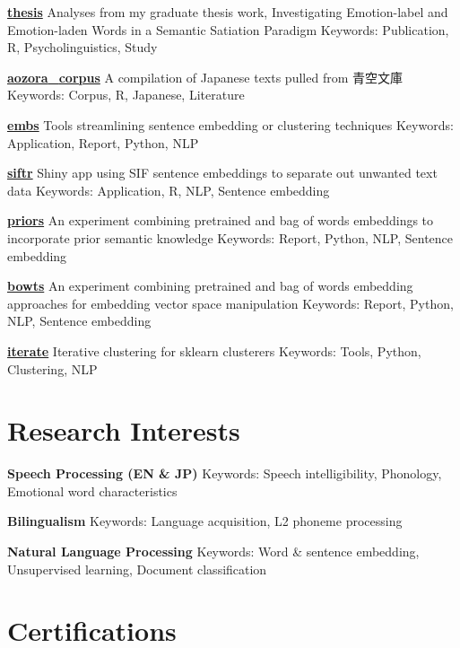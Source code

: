 \documentclass[a4paper,9pt]{extarticle}
\begin{document}
\noindent
\textbf{\href{https://github.com/ryancahildebrandt/thesis}{thesis}}
Analyses from my graduate thesis work, Investigating Emotion-label and Emotion-laden Words in a Semantic Satiation Paradigm
Keywords: Publication, R, Psycholinguistics, Study

\noindent
\textbf{\href{https://github.com/ryancahildebrandt/aozora_corpus}{aozora{\_}corpus}}
A compilation of Japanese texts pulled from 青空文庫
Keywords: Corpus, R, Japanese, Literature

\noindent
\textbf{\href{https://github.com/ryancahildebrandt/embs}{embs}}
Tools streamlining sentence embedding or clustering techniques
Keywords: Application, Report, Python, NLP

\noindent
\textbf{\href{https://github.com/ryancahildebrandt/siftr}{siftr}}
Shiny app using SIF sentence embeddings to separate out unwanted text data
Keywords: Application, R, NLP, Sentence embedding

\noindent
\textbf{\href{https://github.com/ryancahildebrandt/priors}{priors}}
An experiment combining pretrained and bag of words embeddings to incorporate prior semantic knowledge
Keywords: Report, Python, NLP, Sentence embedding

\noindent
\textbf{\href{https://github.com/ryancahildebrandt/bowts}{bowts}}
An experiment combining pretrained and bag of words embedding approaches for embedding vector space manipulation
Keywords: Report, Python, NLP, Sentence embedding

\noindent
\textbf{\href{https://github.com/ryancahildebrandt/iterate}{iterate}}
Iterative clustering for sklearn clusterers
Keywords: Tools, Python, Clustering, NLP

\section*{Research Interests}

\noindent
\textbf{Speech Processing (EN \& JP)}
Keywords: Speech intelligibility, Phonology, Emotional word characteristics

\noindent
\textbf{Bilingualism}
Keywords: Language acquisition, L2 phoneme processing

\noindent
\textbf{Natural Language Processing}
Keywords: Word \& sentence embedding, Unsupervised learning, Document classification

\section*{Certifications}
\end{document}
